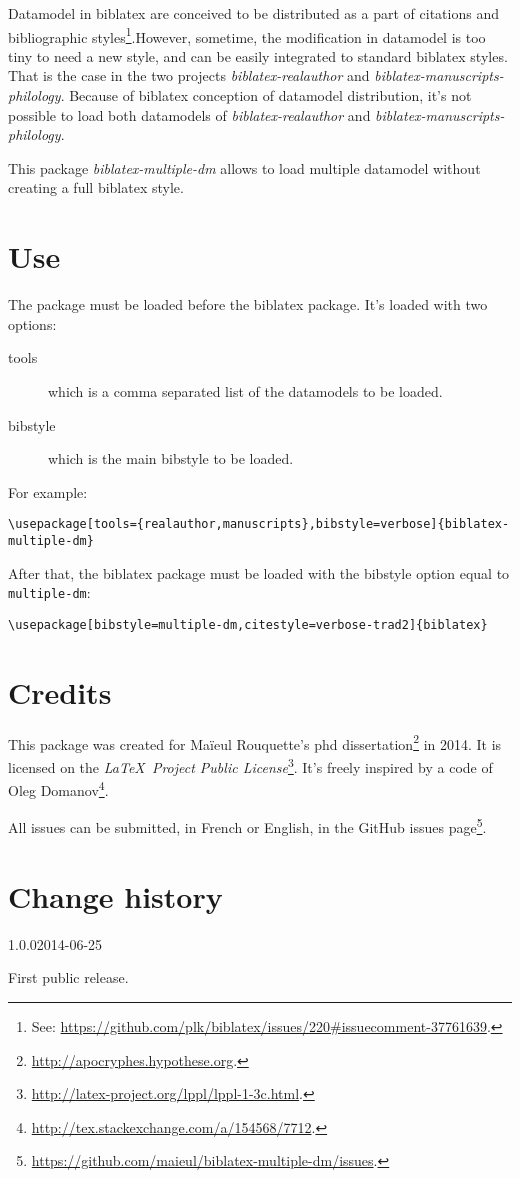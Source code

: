 \documentclass{ltxdockit}[2011/03/25]
\newcommand{\biblatex}{biblatex\xspace}
\begin{document}
\printtitlepage
\tableofcontents

Datamodel in \biblatex are conceived to be distributed as a part of citations and bibliographic styles\footnote{See: \url{https://github.com/plk/biblatex/issues/220\#issuecomment-37761639}.}.However, sometime, the modification in datamodel is too tiny to need a new style, and can be easily integrated to standard \biblatex styles. That is the case in the two projects \emph{biblatex-realauthor} and \emph{biblatex-manuscripts-philology}. Because of \biblatex conception of datamodel distribution, it's not possible to load both datamodels of \emph{biblatex-realauthor} and \emph{biblatex-manuscripts-philology}.

This package \emph{biblatex-multiple-dm} allows to load multiple datamodel without creating a full \biblatex style. 

\section{Use}
The package must be loaded before the \biblatex package. It's loaded with two options:
\begin{description}
	\item[tools] which is a comma separated list of the datamodels to be loaded.
	\item[bibstyle] which is the main bibstyle to be loaded.
\end{description}

For example:
\begin{verbatim}
\usepackage[tools={realauthor,manuscripts},bibstyle=verbose]{biblatex-multiple-dm}
\end{verbatim}

After that, the \biblatex package must be loaded with the bibstyle option equal to \verb+multiple-dm+:
\begin{verbatim}
\usepackage[bibstyle=multiple-dm,citestyle=verbose-trad2]{biblatex}
\end{verbatim}
\section{Credits}

This package was created for Maïeul Rouquette's phd dissertation\footnote{\url{http://apocryphes.hypothese.org}.} in 2014. It is licensed on the \emph{\LaTeX\ Project Public License}\footnote{\url{http://latex-project.org/lppl/lppl-1-3c.html}.}. It's freely inspired by a code of Oleg Domanov\footnote{\url{http://tex.stackexchange.com/a/154568/7712}.}.


All issues can be submitted, in French or English, in the GitHub issues page\footnote{\url{https://github.com/maieul/biblatex-multiple-dm/issues}.}.

\section{Change history}

\begin{changelog}



\begin{release}{1.0.0}{2014-06-25}
\item First public release.
\end{release}
\end{changelog}
\end{document}

